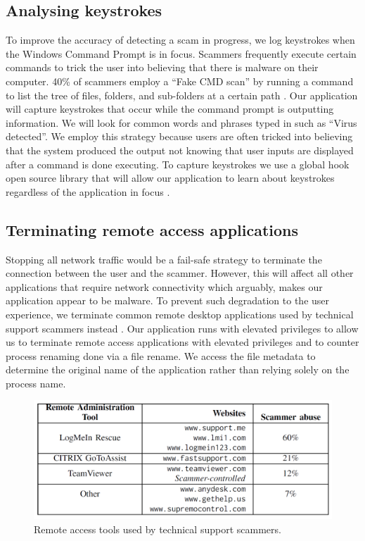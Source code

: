 \documentclass[final]{IEEEtran}
\begin{document}
\subsection{Analysing keystrokes}
To improve the accuracy of detecting a scam in progress, we log keystrokes when the Windows Command Prompt is in focus. Scammers frequently execute certain commands to trick the user into believing that there is malware on their computer. 40\% of scammers employ a “Fake CMD scan” by running a command to list the tree of files, folders, and sub-folders at a certain path \cite[p.7]{b2}. Our application will capture keystrokes that occur while the command prompt is outputting information. We will look for common words and phrases typed in such as “Virus detected”. We employ this strategy because users are often tricked into believing that the system produced the output not knowing that user inputs are displayed after a command is done executing. To capture keystrokes we use a global hook open source library that will allow our application to learn about keystrokes regardless of the application in focus \cite {b5}.

\subsection{Terminating remote access applications}
Stopping all network traffic would be a fail-safe strategy to terminate the connection between the user and the scammer. However, this will affect all other applications that require network connectivity which arguably, makes our application appear to be malware. To prevent such degradation to the user experience, we terminate common remote desktop applications used by technical support scammers instead \cite[Fig 4]{b2}. Our application runs with elevated privileges to allow us to terminate remote access applications with elevated privileges and to counter process renaming done via a file rename. We access the file metadata to determine the original name of the application rather than relying solely on the process name.

\begin{figure}[htbp]
\centerline{\includegraphics[keepaspectratio=true, scale = 0.22]{RemoteTools.png}}
\caption{Remote access tools used by technical support scammers.}
\label{fig 4}
\end{figure}
\end{document}

